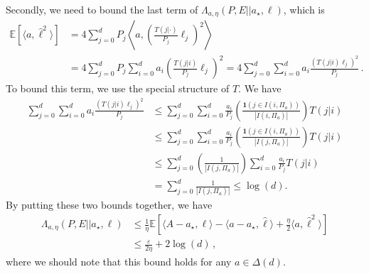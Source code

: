 \documentclass{article}
\theoremstyle{plain}
\theoremstyle{definition}
\renewcommand{\epsilon}{\varepsilon}
\newcommand{\E}{\mathbb E}
\newcommand{\hl}{\hat{\ell}\xspace}
\begin{document}
Secondly, we need to bound the last term of $\Lambda_{a, \eta}(P, E || a_\star, \ell)$, which is
\begin{align*}
    \E\!\left[
        \langle a, \hl^2 \rangle
        \right]
     & =
    4
    \sum_{j=0}^{d}
    P_j
    \left\langle
    a,
    \left(
    \frac{T(j|\cdot)}{P_j} \ell_j
    \right)^2
    \right\rangle
    \\
     & =
    4
    \sum_{j=0}^{d}
    P_j
    \sum_{i=0}^{d}
    a_i
    \left(
    \frac{T(j|i)}{P_j} \ell_j
    \right)^2
    =
    4
    \sum_{j=0}^{d}
    \sum_{i=0}^{d}
    a_i
    \frac{
        \left(
        T(j|i) \ell_j
        \right)^2
    }{P_j}
    \,.
\end{align*}
To bound this term, we use the special structure of $T$.
We have
\begin{align*}
    \sum_{j=0}^{d}
    \sum_{i=0}^{d}
    a_i
    \frac{
        \left(
        T(j|i) \ell_j
        \right)^2
    }{P_j}
     & \leq
    \sum_{j=0}^{d}
    \sum_{i=0}^{d}
    \frac{
        a_i
    }{P_j}
    \left(
    \frac{\mathbf{1}(j \in I(i, \Pi_a))}{|I(i, \Pi_a)|}
    \right)
    T(j|i)
    \\
     & \leq
    \sum_{j=0}^{d}
    \sum_{i=0}^{d}
    \frac{
        a_i
    }{P_j}
    \left(
    \frac{\mathbf{1}(j \in I(i, \Pi_a))}{|I(j, \Pi_a)|}
    \right)
    T(j|i)
    \\
     & \leq
    \sum_{j=0}^{d}
    \left(
    \frac{1}{|I(j, \Pi_a)|}
    \right)
    \sum_{i=0}^{d}
    \frac{
        a_i
    }{P_j}
    T(j|i)
    \\
     & =
    \sum_{j=0}^{d}
    \frac{1}{|I(j, \Pi_a)|}
    \leq
    \log(d).
\end{align*}
By putting these two bounds together, we have
\begin{align*}
    \Lambda_{a, \eta}(P, E || a_\star, \ell)
     & \leq
    \frac{1}{\eta}
    \E\!\left[
        \langle A - a_\star, \ell \rangle
        - \langle a - a_\star, \hl \rangle
        + \frac{\eta}{2} \langle a, \hl^2 \rangle
        \right]
    \\
     & \leq
    \frac{\epsilon}{2 \eta}
    +
    2 \log(d)\,,
\end{align*}
where we should note that this bound holds for any $a \in \Delta(d)$.
\end{document}
